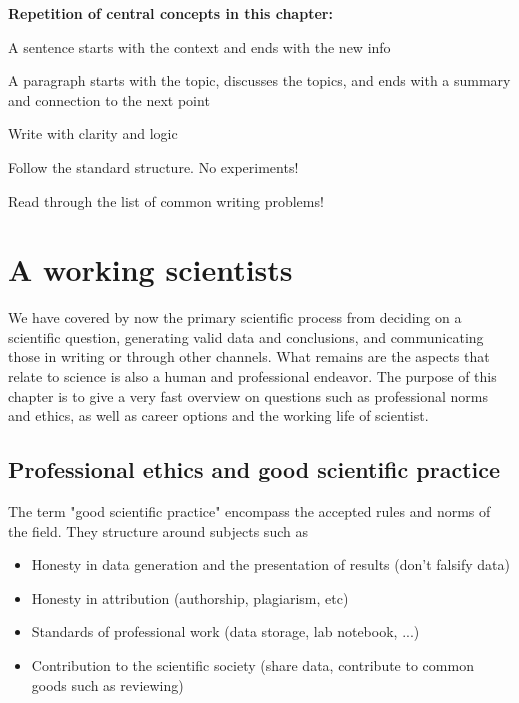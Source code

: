 \documentclass{tufte-book}
\begin{document}
\vspace{1cm}
\begin{mdframed}
    
\textbf{Repetition of central concepts in this chapter:} 

\begin{itemize*}
  \item A sentence starts with the context and ends with the new info
  \item A paragraph starts with the topic, discusses the topics, and ends with a summary and connection to the next point
  \item Write with clarity and logic
  \item Follow the standard structure. No experiments!
  \item Read through the list of common writing problems!
\end{itemize*}

\end{mdframed}

\chapter{A working scientists}

We have covered by now the primary scientific process from deciding on a scientific question, generating valid data and conclusions, and communicating those in writing or through other channels. What remains are the aspects that relate to science is also a human and professional endeavor. The purpose of this chapter is to give a very fast overview on questions such as professional norms and ethics, as well as career options and the working life of scientist.

\section{Professional ethics and good scientific practice}

The term "good scientific practice" encompass the accepted rules and norms of the field. They structure around subjects such as 

\begin{itemize}
\item Honesty in data generation and the presentation of results (don't falsify data)
\item Honesty in attribution (authorship, plagiarism, etc)
\item Standards of professional work (data storage, lab notebook, ...)
\item Contribution to the scientific society (share data, contribute to common goods such as reviewing)
\end{itemize}
\end{document}
